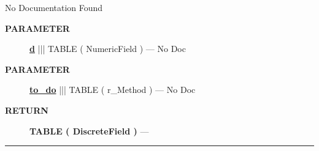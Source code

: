 No Documentation Found






\par
\begin{description}
\item [\colorbox{tagtype}{\color{white} \textbf{\textsf{PARAMETER}}}] \textbf{\underline{d}} ||| TABLE ( NumericField ) --- No Doc
\item [\colorbox{tagtype}{\color{white} \textbf{\textsf{PARAMETER}}}] \textbf{\underline{to\_do}} ||| TABLE ( r\_Method ) --- No Doc
\end{description}







\par
\begin{description}
\item [\colorbox{tagtype}{\color{white} \textbf{\textsf{RETURN}}}] \textbf{TABLE ( DiscreteField )} --- 
\end{description}




\rule{\linewidth}{0.5pt}


